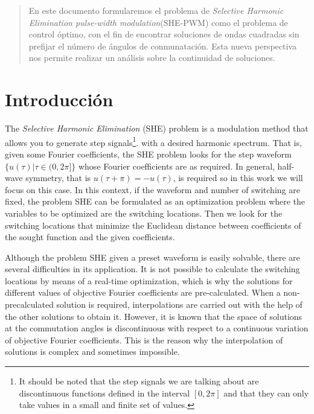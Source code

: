 
\begin{abstract}
    En este documento formularemos el problema de \emph{Selective Harmonic Elimination pulse-width modulation}(SHE-PWM) como el problema de control óptimo, con el fin de encontrar soluciones de ondas cuadradas sin prefijar el número de ángulos de conmunatación. Esta nueva perspectiva nos permite realizar un análisis sobre la continuidad de soluciones.
\end{abstract}
\tableofcontents

\section{Introducción} 

The \emph{Selective Harmonic Elimination} (SHE) problem is a modulation method that allows you to generate step signals\footnote{It should be noted that the step signals we are talking about are discontinuous functions defined in the interval $ [0,2 \pi] $ and that they can only take values in a small and finite set of values.}.
with a desired harmonic spectrum.
%
That is, given some Fourier coefficients, the SHE problem looks for the step waveform $ \{u (\tau) | \tau \in (0,2 \pi] \} $ whose Fourier coefficients are as required.
%
In general, half-wave symmetry, that is $ u (\tau + \pi) = - u (\tau) $, is required so in this work we will focus on this case.
%
In this context, if the waveform and number of switching are fixed, the problem SHE can be formulated as an optimization problem where the variables to be optimized are the switching locations.
%
Then we look for the switching locations that minimize the Euclidean distance between coefficients of the sought function and the given coefficients.
\newline 

%
Although the problem SHE given a preset waveform is easily solvable, there are several difficulties in its application.
%
It is not possible to calculate the switching locations by means of a real-time optimization, which is why the solutions for different values of objective Fourier coefficients are pre-calculated.
%
When a non-precalculated solution is required, interpolations are carried out with the help of the other solutions to obtain it.
%
However, it is known that the space of solutions at the commutation angles is discontinuous with respect to a continuous variation of objective Fourier coefficients.
%
This is the reason why the interpolation of solutions is complex and sometimes impossible.
\newline

